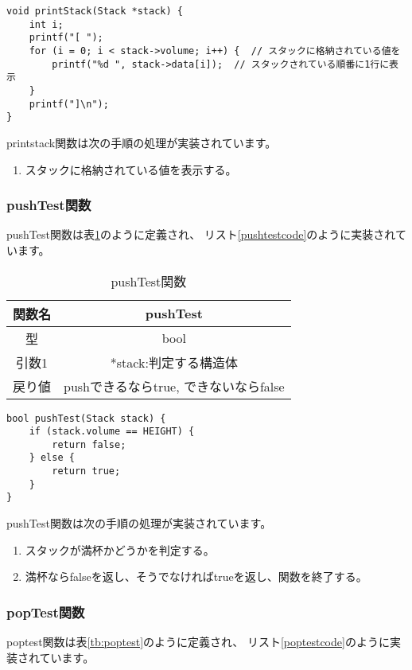 \documentclass[a4j]{jarticle}
\begin{document}
\begin{lstlisting}[caption=printstack関数,label=printstackcode]
  void printStack(Stack *stack) {
    int i;
    printf("[ ");
    for (i = 0; i < stack->volume; i++) {  // スタックに格納されている値を
        printf("%d ", stack->data[i]);  // スタックされている順番に1行に表示
    }
    printf("]\n");
}
  \end{lstlisting}

printstack関数は次の手順の処理が実装されています。
\begin{enumerate}
  \item スタックに格納されている値を表示する。
\end{enumerate}

\subsubsection{pushTest関数}
pushTest関数は表\ref{tb:pushtest}のように定義され、
リスト\ref{pushtestcode}のように実装されています。

\begin{table}[h]
  \centering
  \caption{pushTest関数}
  \label{tb:pushtest}
  \begin{tabular}{|c|c|}
    \hline
    関数名 & pushTest                   \\
    \hline
    型   & bool                       \\
    \hline
    引数1 & *stack:判定する構造体             \\
    \hline
    戻り値 & pushできるならtrue, できないならfalse \\
    \hline
  \end{tabular}
\end{table}

\begin{lstlisting}[caption=pushTest関数,label=pushtestcode]
  bool pushTest(Stack stack) {
    if (stack.volume == HEIGHT) {
        return false;
    } else {
        return true;
    }
}
\end{lstlisting}

pushTest関数は次の手順の処理が実装されています。
\begin{enumerate}
  \item スタックが満杯かどうかを判定する。
  \item 満杯ならfalseを返し、そうでなければtrueを返し、関数を終了する。
\end{enumerate}

\subsubsection{popTest関数}
poptest関数は表\ref{tb:poptest}のように定義され、
リスト\ref{poptestcode}のように実装されています。
\end{document}
